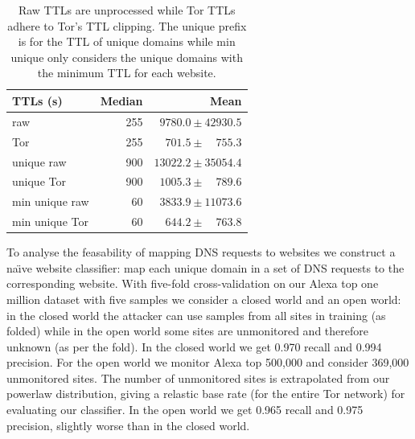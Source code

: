 \begin{table}[t]
\caption{Raw TTLs are unprocessed while Tor TTLs adhere to Tor's TTL clipping.
The unique prefix is for the TTL of unique domains while min unique only
considers the unique domains with the minimum TTL for each website.}
\centering
\begin{tabular}{l r r}
\toprule
\textbf{TTLs (s)} & \textbf{Median} & \textbf{Mean} \\
\midrule
raw & 255 & $9780.0\pm42930.5$ \\ %
Tor & 255 & $701.5\pm\phantom{00}755.3$ \\ %
unique raw & 900 & $13022.2\pm35054.4$ \\ %
unique Tor & 900 & $1005.3\pm\phantom{00}789.6$ \\ %
min unique raw & 60 & $3833.9\pm11073.6$ \\ %
min unique Tor & 60 & $644.2\pm\phantom{00}763.8$ \\ %
\bottomrule
\end{tabular}
\label{tab:ttls}
\end{table}

To analyse the feasability of mapping DNS requests to websites we construct a
na\"{\i}ve website classifier: map each unique domain in a set of DNS requests
to the corresponding website.
With five-fold cross-validation on our Alexa top one million dataset with five
samples we consider a closed world and an open world: in the closed world the
attacker can use samples from all sites in training (as folded) while in the
open world some sites are unmonitored and therefore unknown (as per the fold).
In the closed world we get 0.970 recall and 0.994 precision.
For the open world we monitor Alexa top 500,000 and consider 369,000 unmonitored
sites. The number of unmonitored sites is extrapolated from our powerlaw
distribution, giving a relastic base rate (for the entire Tor network) for
evaluating our classifier.
In the open world we get 0.965 recall and 0.975 precision, slightly
worse than in the closed world.

